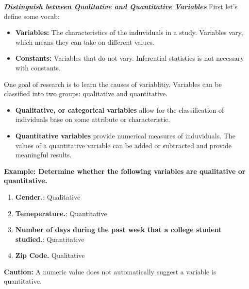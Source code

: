 \documentclass{report}
\begin{document}
        \bigbreak \noindent \bigbreak \noindent 
        \textbf{\textit{\underline{Distinguish between Qualitative and Quantitative Variables}}}
        \bigbreak \noindent 
        First let's define some vocab:
        \begin{itemize}
            \item \textbf{Variables:} The characteristics of the induviduals in a study. Variables vary, which means they can take on different values.
            \item \textbf{Constants:} Variables that do not vary. Inferential statistics is not necessary with constants.
        \end{itemize}
        \bigbreak \noindent 
        One goal of research is to learn the causes of variablitiy.
        \bigbreak \noindent 
        Variables can be classified into two groups: qualitative and quantitative.
        \begin{itemize}
            \item \textbf{Qualitative, or categorical variables} allow for the classification of individuals base on some attribute or characteristic.
            \item \textbf{Quantitative variables} provide numerical measures of induviduals. The values of a quantitative variable can be added or subtracted and provide meaningful results.
        \end{itemize}
        \bigbreak \noindent 
        \begin{mdframed}
          \textbf{Example: Determine whether the following variables are qualitative or quantitative.}
          \begin{enumerate}[label=\alph*.)]
              \item \textbf{Gender.}: Qualitative
              \item \textbf{Temeperature.}: Quantitative
              \item \textbf{Number of days during the past week that a college student studied.}: Quantitative
              \item \textbf{Zip Code.} Qualitative
          \end{enumerate}
          \textbf{Caution:} A numeric value does not automatically suggest a variable is quantitative.
        \end{mdframed}
\end{document}
